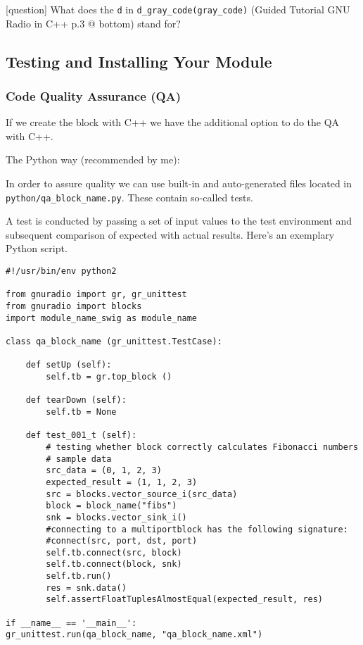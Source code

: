 \documentclass{article}
\begin{document}
\color{black}

\bigskip

\color{blue}
[question] What does the \texttt{d} in \verb|d_gray_code(gray_code)| (Guided Tutorial GNU Radio in C++ p.3 @ bottom) stand for?
\color{black}

\subsection{Testing and Installing Your Module}

\subsubsection{Code Quality Assurance (QA)}

If we create the block with C++ we have the additional option to do the QA with C++. 

\bigskip

The Python way (recommended by me):

\medskip

In order to assure quality we can use built-in and auto-generated files located in \verb|python/qa_block_name.py|. These contain so-called tests.

\medskip

A test is conducted by passing a set of input values to the test environment and subsequent comparison of expected with actual results. Here's an exemplary Python script.

\begin{verbatim}
#!/usr/bin/env python2

from gnuradio import gr, gr_unittest
from gnuradio import blocks
import module_name_swig as module_name

class qa_block_name (gr_unittest.TestCase):

	def setUp (self):
		self.tb = gr.top_block ()
	
	def tearDown (self):
		self.tb = None
	
	def test_001_t (self):
		# testing whether block correctly calculates Fibonacci numbers
		# sample data 
		src_data = (0, 1, 2, 3)
		expected_result = (1, 1, 2, 3)
		src = blocks.vector_source_i(src_data)
		block = block_name("fibs")
		snk = blocks.vector_sink_i()
		#connecting to a multiportblock has the following signature:
		#connect(src, port, dst, port)
		self.tb.connect(src, block)
		self.tb.connect(block, snk)
		self.tb.run()
		res = snk.data()
		self.assertFloatTuplesAlmostEqual(expected_result, res)

if __name__ == '__main__':
gr_unittest.run(qa_block_name, "qa_block_name.xml")

\end{verbatim}
\end{document}
